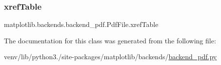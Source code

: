 \subsubsection{\texorpdfstring{xref\+Table}{xrefTable}}
{\footnotesize\ttfamily matplotlib.\+backends.\+backend\+\_\+pdf.\+Pdf\+File.\+xref\+Table}



The documentation for this class was generated from the following file\+:\begin{DoxyCompactItemize}
\item 
venv/lib/python3./site-\/packages/matplotlib/backends/\hyperlink{backend__pdf_8py}{backend\+\_\+pdf.\+py}\end{DoxyCompactItemize}
